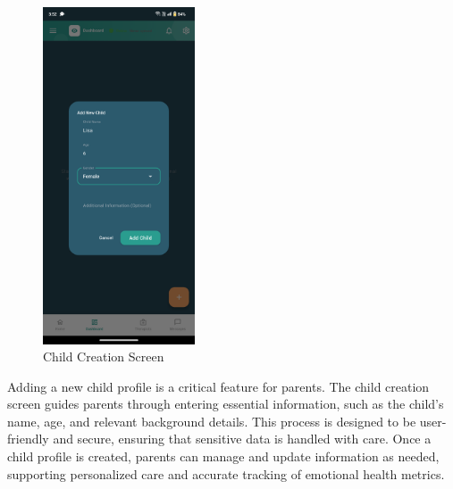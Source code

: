\documentclass[12pt,a4paper]{article}
\begin{document}
\begin{figure}[H]
    \centering
    \includegraphics[width=0.4\textwidth]{Screenshots/childcreation.png}
    \caption{Child Creation Screen}
    \label{fig:child-creation}
\end{figure}
Adding a new child profile is a critical feature for parents. The child creation screen guides parents through entering essential information, such as the child's name, age, and relevant background details. This process is designed to be user-friendly and secure, ensuring that sensitive data is handled with care. Once a child profile is created, parents can manage and update information as needed, supporting personalized care and accurate tracking of emotional health metrics.
\end{document}
